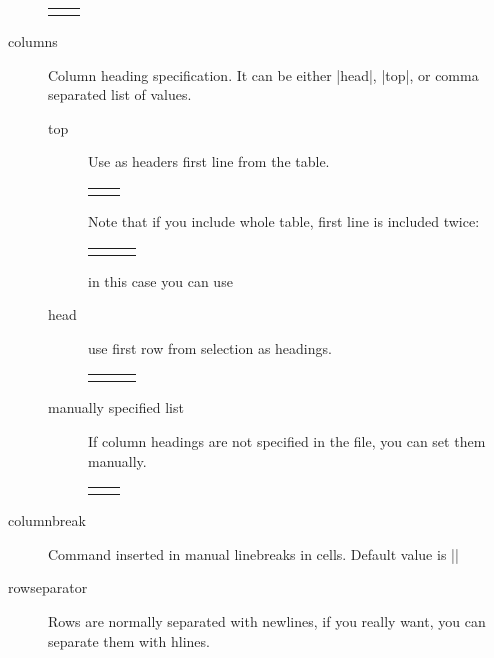\documentclass{ltxdoc}
\begin{document}
\begin{description}
\begin{LTXexample}
\begin{tabular}{ll}
\end{tabular}     
\end{LTXexample}  
\item[columns] Column heading specification. It can be either |head|, |top|, or comma separated list of values.
\begin{description}
\item[top] Use as headers first line from the table.
\begin{LTXexample}
\begin{tabular}{ll}
\end{tabular}
\end{LTXexample}
Note that if you include whole table, first line is included twice:
\begin{LTXexample}
\begin{tabular}{lll}
\end{tabular}     
\end{LTXexample}
in this case you can use
\item[head] use first row from selection as headings.
\begin{LTXexample}
\begin{tabular}{lll}
\end{tabular}     
\end{LTXexample}
\item[manually specified list] If column headings are not specified in the file, you can set them manually.
\begin{LTXexample}
\begin{tabular}{ll}
\end{tabular}     
\end{LTXexample}
\end{description}
\item[columnbreak] Command inserted in manual linebreaks in cells. Default value is |\linebreak|

\item[rowseparator] Rows are normally separated with newlines, if you really want, you can separate them with hlines. 


\end{description}
\end{document}
